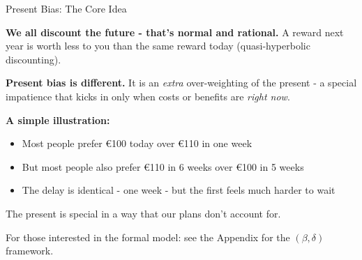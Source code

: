 \documentclass[10pt]{beamer}
\begin{document}
\begin{frame}{Present Bias: The Core Idea}

\textbf{We all discount the future - that's normal and rational.}
A reward next year is worth less to you than the same reward today (quasi-hyperbolic discounting).


\textbf{Present bias is different.}
It is an \emph{extra} over-weighting of the present - a special impatience that kicks in only when costs or benefits are \emph{right now}.


\textbf{A simple illustration:}
\begin{itemize}
 \item Most people prefer \euro 100 today over \euro 110 in one week
\item But most people also prefer \euro 110 in 6 weeks over \euro 100 in 5 weeks
\item The delay is identical - one week - but the first feels much harder to wait
\end{itemize}


\alert{The present is special in a way that our plans don't account for.}


\footnotesize For those interested in the formal model: see the Appendix for the $(\beta, \delta)$ framework.
\end{frame}
\end{document}
